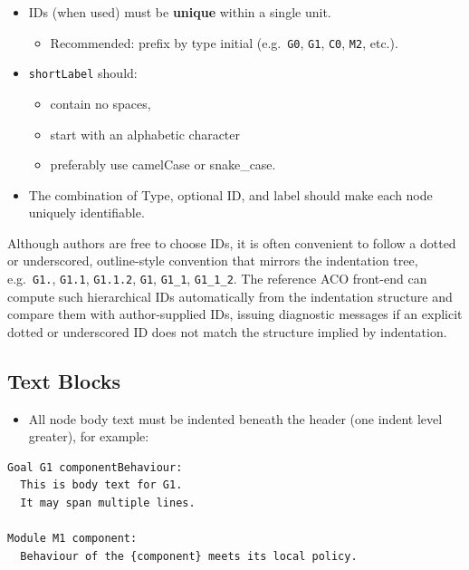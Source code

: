 \documentclass[11pt]{article}
\begin{document}
\begin{itemize}[leftmargin=2em]
  \item IDs (when used) must be \textbf{unique} within a single unit.
  \begin{itemize}[leftmargin=1.5em]
    \item Recommended: prefix by type initial (e.g.\ \texttt{G0}, \texttt{G1}, \texttt{C0}, \texttt{M2}, etc.).
  \end{itemize}

  \item \texttt{shortLabel} should:
  \begin{itemize}[leftmargin=1.5em]
    \item contain no spaces,
    \item start with an alphabetic character
    \item preferably use camelCase or snake\_case.
  \end{itemize}

  \item The combination of Type, optional ID, and label should make each node uniquely identifiable.
\end{itemize}

Although authors are free to choose IDs, it is often convenient to follow a dotted or underscored, outline-style convention that mirrors the indentation tree, e.g.\ \texttt{G1.}, \texttt{G1.1}, \texttt{G1.1.2},
\texttt{G1}, \texttt{G1\_1}, \texttt{G1\_1\_2}. The reference ACO front-end can compute such hierarchical IDs automatically from the indentation structure and compare them with author-supplied IDs, issuing diagnostic messages if an explicit dotted or underscored ID does not match the structure implied by indentation.

\subsection{Text Blocks}

\begin{itemize}[leftmargin=2em]
  \item All node body text must be indented beneath the header (one indent level greater), for example:
\end{itemize}

\begin{verbatim}
Goal G1 componentBehaviour:
  This is body text for G1.
  It may span multiple lines.

Module M1 component:
  Behaviour of the {component} meets its local policy.
\end{verbatim}
\end{document}
